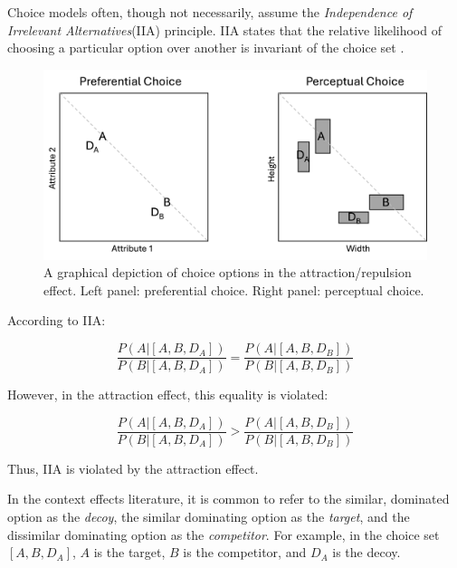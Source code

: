 Choice models often, though not necessarily, assume the \textit{Independence of Irrelevant Alternatives}(IIA) principle. IIA states that the relative likelihood of choosing a particular option over another is invariant of the choice set \parencite{ray1973independence}. 

\begin{figure}
   \includegraphics[width=\linewidth]{figures/pref_v_percep.jpg}
   \caption{A graphical depiction of choice options in the attraction/repulsion effect. Left panel: preferential choice. Right panel: perceptual choice.}
   \label{fig:fig_opts}
\end{figure}

According to IIA:

\begin{equation}
  \frac{P(A|[A,B,D_{A}])}{P(B|[A,B,D_{A}])}=\frac{P(A|[A,B,D_{B}])}{P(B|[A,B,D_{B}])}
  \label{eqn:iia}
\end{equation}

However, in the attraction effect, this equality is violated:

\begin{equation}
  \frac{P(A|[A,B,D_{A}])}{P(B|[A,B,D_{A}])}>\frac{P(A|[A,B,D_{B}])}{P(B|[A,B,D_{B}])}
  \label{eqn:iia_att}
\end{equation}

Thus, IIA is violated by the attraction effect.

In the context effects literature, it is common to refer to the similar, dominated option as the \textit{decoy}, the similar dominating option as the \textit{target}, and the dissimilar dominating option as the \textit{competitor}. For example, in the choice set $[A,B,D_{A}]$, $A$ is the target, $B$ is the competitor, and $D_{A}$ is the decoy.

